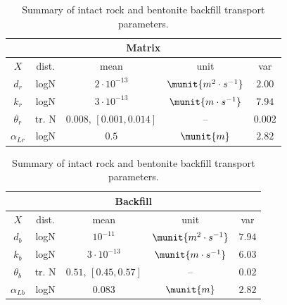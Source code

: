 \begin{table}[ht]
    \caption{Summary of intact rock and bentonite backfill transport parameters.}
    \label{tab:param_matrix_backfill}
    \centering
    \begin{minipage}{0.44\textwidth}
        \centering
        \footnotesize
        \setlength{\tabcolsep}{4pt}
        \renewcommand{\arraystretch}{1.25}
        \begin{tabular}{@{}ccccc@{}}
        \toprule
        \multicolumn{5}{c}{Matrix} \\
        \toprule
        $X$ & dist. & mean & unit & var \\
        \midrule
        $d_r$ & logN & $2 \cdot 10^{-13}$ & 
        $\munit{m^2\cdot s^{-1}}$ & $2.00$ \\
        \(k_r\) & logN & $3 \cdot 10^{-13}$ & $\munit{m\cdot s^{-1}}$& $7.94$ \\
        \(\theta_r\) & tr. N & $0.008,\,[0.001,0.014]$ & -- & $0.002$ \\
        \(\alpha_{Lr}\) & logN & $0.5$ & $\munit{m}$ & $2.82$ \\
        \bottomrule
        \end{tabular}
    \end{minipage}
    \hfill
    \begin{minipage}{0.44\textwidth}
        \centering
        \footnotesize
        \setlength{\tabcolsep}{4pt}
        \renewcommand{\arraystretch}{1.25}
        \begin{tabular}{@{}ccccc@{}}
        \toprule
        \multicolumn{5}{c}{Backfill} \\
        \toprule
        $X$ & dist. & mean & unit & var \\
        \midrule
        $d_b$ & logN & $10^{-11}$ & 
        $\munit{m^2\cdot s^{-1}}$ & $7.94$ \\
        \(k_b\) & logN & $3\cdot10^{-13}$ & $\munit{m\cdot s^{-1}}$& $6.03$ \\
        \(\theta_b\) & tr. N & $0.51,\,[0.45,0.57]$ & -- & $0.02$ \\
        \(\alpha_{Lb}\) & logN & $0.083$ & $\munit{m}$ & $2.82$ \\
        \bottomrule
        \end{tabular}
    \end{minipage}

\end{table}





